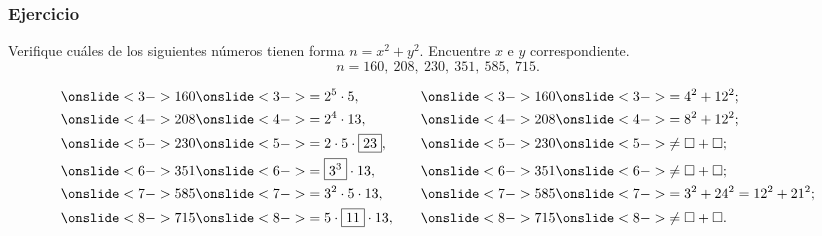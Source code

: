 \documentclass[handout]{beamer}
\begin{document}
\begin{frame}[fragile]
  \frametitle{Ejercicio}
  \begin{shaded}
    Verifique cuáles de los siguientes números tienen forma $n = x^2 + y^2$.
    Encuentre $x$ e $y$ correspondiente.
    \[ n = 160, ~ 208, ~ 230, ~ 351, ~ 585, ~ 715. \]
  \end{shaded}

  \ifdefined\solutions

  \begin{align*}
    \onslide<3->{160} & \onslide<3->{= 2^5\cdot 5,} & \quad \onslide<3->{160} & \onslide<3->{= 4^2 + 12^2;} \\
    \onslide<4->{208} & \onslide<4->{= 2^4\cdot 13,} & \quad \onslide<4->{208} & \onslide<4->{= 8^2 + 12^2;} \\
    \onslide<5->{230} & \onslide<5->{= 2\cdot 5\cdot \boxed{23},} & \quad \onslide<5->{230} & \onslide<5->{\ne \square + \square;} \\
    \onslide<6->{351} & \onslide<6->{= \boxed{3^3}\cdot 13,} & \quad \onslide<6->{351} & \onslide<6->{\ne \square + \square;} \\
    \onslide<7->{585} & \onslide<7->{= 3^2\cdot 5\cdot 13,} & \quad \onslide<7->{585} & \onslide<7->{= 3^2 + 24^2 = 12^2 + 21^2;} \\
    \onslide<8->{715} & \onslide<8->{= 5\cdot \boxed{11}\cdot 13,} & \quad \onslide<8->{715} & \onslide<8->{\ne \square + \square.}
  \end{align*}
  \fi
\end{frame}

\end{document}
